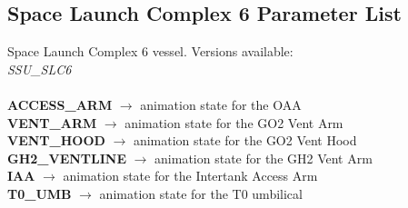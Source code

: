 \documentclass[Space_Shuttle_Ultra_Manual.tex]{subfiles}
\begin{document}
\begin{multicols*}{2}
\subsection{Space Launch Complex 6 Parameter List}
\noindent
Space Launch Complex 6 vessel. Versions available:
\\
\textit{SSU\_SLC6}
\\
\\
\textbf{ACCESS\_ARM} $\rightarrow$ animation state for the OAA
\\
\textbf{VENT\_ARM} $\rightarrow$ animation state for the GO2 Vent Arm
\\
\textbf{VENT\_HOOD} $\rightarrow$ animation state for the GO2 Vent Hood
\\
\textbf{GH2\_VENTLINE} $\rightarrow$ animation state for the GH2 Vent Arm
\\
\textbf{IAA} $\rightarrow$ animation state for the Intertank Access Arm
\\
\textbf{T0\_UMB} $\rightarrow$ animation state for the T0 umbilical
\end{multicols*}
\end{document}
